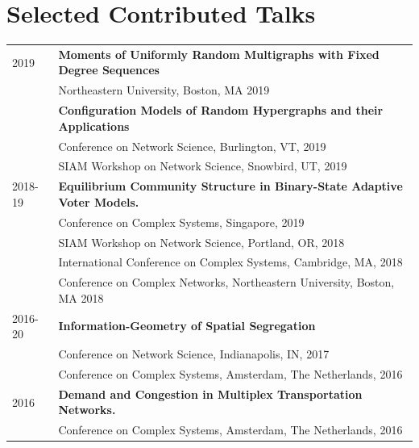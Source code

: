 \documentclass[11pt,fullpage]{article}
\begin{document}
\section*{Selected Contributed Talks}
	\vspace{-10pt}
	\begin{longtable}{p{0.6in}|p{5.5in}}
	2019 & \textbf{Moments of Uniformly Random Multigraphs with Fixed Degree Sequences} \\ 
		&\quad Northeastern University, Boston, MA 2019 \\ 
		& \textbf{Configuration Models of Random Hypergraphs and their Applications} \\
		&\quad Conference on Network Science, Burlington, VT, 2019 \\ 
		&\quad SIAM Workshop on Network Science, Snowbird, UT, 2019 \\ 
	2018-19 & \textbf{Equilibrium Community Structure in Binary-State Adaptive Voter Models.} \\ 
		&\quad Conference on Complex Systems, Singapore, 2019 \\
		&\quad SIAM Workshop on Network Science, Portland, OR, 2018 \\
		&\quad International Conference on Complex Systems, Cambridge, MA, 2018  \\
		&\quad Conference on Complex Networks, Northeastern University, Boston, MA 2018 \\
	2016-20 & \textbf{Information-Geometry of Spatial Segregation} \\
		&\quad Conference on Network Science, Indianapolis, IN, 2017 \\
		&\quad Conference on Complex Systems, Amsterdam, The Netherlands, 2016 \\
	2016 & \textbf{Demand and Congestion in Multiplex Transportation Networks.} \\ 
	&\quad Conference on Complex Systems, Amsterdam, The Netherlands, 2016
	\end{longtable}
\end{document}
